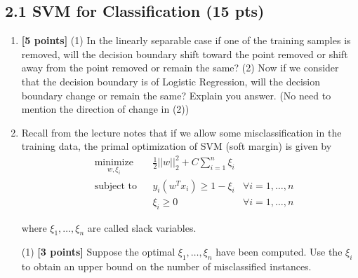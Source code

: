\documentclass{article}
\begin{document}
\subsection*{2.1 SVM for Classification (15 pts)}
\begin{enumerate}

\item\textbf{[5 points]} (1) In the linearly separable case if one of the training samples is removed, will the decision boundary shift toward the point removed or shift away from the point removed or remain the same? (2) Now if we consider that the decision boundary is of Logistic Regression, will the decision boundary change or remain the same? Explain you answer. (No need to mention the direction of change in (2)) \\




\item Recall from the lecture notes that if we allow some misclassification in the training data, the primal optimization of SVM (soft margin) is given by
$$
\begin{aligned}
& \underset{w, \xi_i}{\text{minimize}} && \frac{1}{2}||w||_2^2 + C\sum_{i=1}^n\xi_i\\
& \text{subject to} && y_i(w^Tx_i) \geq 1-\xi_i & \forall i = 1,\ldots, n\\
& && \xi_i \geq 0 & \forall i = 1,\ldots, n
\end{aligned}
$$

where $\xi_1,\ldots, \xi_n$ are called slack variables.
%

	(1) \textbf{[3 points]} Suppose the optimal $\xi_1,\ldots,\xi_n$ have been computed. Use the $\xi_i$ to obtain an upper bound on the number of misclassified instances.





\end{enumerate}
\end{document}
